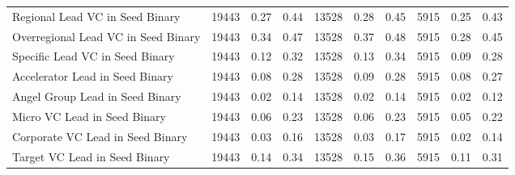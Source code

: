 {\begin{table}[!h]
{\begin{tabular}[t]{lrrrrrrrrr}
Regional Lead VC in Seed Binary & 19443 & 0.27 & 0.44 & 13528 & 0.28 & 0.45 & 5915 & 0.25 & 0.43\\
Overregional Lead VC in Seed Binary & 19443 & 0.34 & 0.47 & 13528 & 0.37 & 0.48 & 5915 & 0.28 & 0.45\\
Specific Lead VC in Seed Binary & 19443 & 0.12 & 0.32 & 13528 & 0.13 & 0.34 & 5915 & 0.09 & 0.28\\
Accelerator Lead in Seed Binary & 19443 & 0.08 & 0.28 & 13528 & 0.09 & 0.28 & 5915 & 0.08 & 0.27\\
\addlinespace
Angel Group Lead in Seed Binary & 19443 & 0.02 & 0.14 & 13528 & 0.02 & 0.14 & 5915 & 0.02 & 0.12\\
Micro VC Lead in Seed Binary & 19443 & 0.06 & 0.23 & 13528 & 0.06 & 0.23 & 5915 & 0.05 & 0.22\\
Corporate VC Lead in Seed Binary & 19443 & 0.03 & 0.16 & 13528 & 0.03 & 0.17 & 5915 & 0.02 & 0.14\\
Target VC Lead in Seed Binary & 19443 & 0.14 & 0.34 & 13528 & 0.15 & 0.36 & 5915 & 0.11 & 0.31\\
\bottomrule
\end{tabular}}
\end{table}
}
